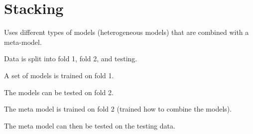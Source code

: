	\section{Stacking}
Uses different types of models (heterogeneous models) that are combined with a meta-model.

	\begin{numberedlist}
		\item Data is split into fold 1, fold 2, and testing.
		\item A set of models is trained on fold 1.
		\item The models can be tested on fold 2.
		\item The meta model is trained on fold 2 (trained how to combine the models).
		\item The meta model can then be tested on the testing data.
	\end{numberedlist} 